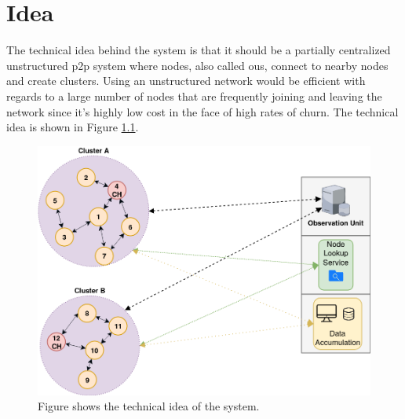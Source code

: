 \documentclass[USenglish]{uit-thesis}
\begin{document}
\chapter{Idea} \label{chap:idea}
\glsresetall





The technical idea behind the system is that it should be a partially centralized unstructured \gls{p2p} system where nodes, also called \gls{ou}s, connect to nearby nodes and create clusters. Using an unstructured network would be efficient with regards to a large number of nodes that are frequently joining and leaving the network since it's highly low cost in the face of high rates of churn. The technical idea is shown in Figure \ref{fig:idea}. 

\begin{figure}
\centering
\includegraphics[width=\textwidth]{idea.png}
\caption{Figure shows the technical idea of the system.}
\label{fig:idea}
\end{figure}
\end{document}
